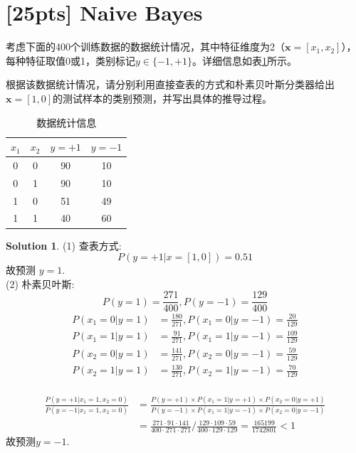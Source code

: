 \documentclass[a4paper,UTF8]{article}
\numberwithin{equation}{section}
\theoremstyle{definition}
\newtheorem*{solution}{Solution}
\begin{document}
\section{[25pts] Naive Bayes}
考虑下面的400个训练数据的数据统计情况，其中特征维度为2（$\mathbf{x}=[x_1,x_2]$），每种特征取值0或1，类别标记$y\in\{-1,+1\}$。详细信息如表\ref{table:training}所示。

根据该数据统计情况，请分别利用直接查表的方式和朴素贝叶斯分类器给出$\mathbf{x}=[1,0]$的测试样本的类别预测，并写出具体的推导过程。
\begin{table}[h]
\centering
\caption{数据统计信息}
\label{table:training}\vspace{2mm}
\begin{tabular}{cc|cc}\hline
$x_1$		&  $x_2$ 	&	$y=+1$	&	$y=-1$ 	\\ \hline
0		&  0 	&	90	&	10 \\
0		&  1 	&	90 	&	10 \\
1		&  0 	&	51 	&	49 \\
1		&  1 	&	40 	&	60 \\\hline
\end{tabular}
\end{table}

\begin{solution}
(1) 查表方式: \\
\begin{equation}
P(y=+1 | x = [1, 0]) = 0.51 
\end{equation}
故预测 $y=1$. \\ 

(2) 朴素贝叶斯: \\
\begin{equation}
P(y = 1) = \frac{271}{400}, P(y=-1) = \frac{129}{400}
\end{equation}
\begin{equation}
\begin{split}
P({x_1=0 |  y=1}) &=  \frac{180}{271}, P({x_1=0| y=-1}) =  \frac{20}{129} \\ 
P({x_1=1| y = 1}) &=  \frac{91}{271}, P({x_1 = 1| y=-1}) =  \frac{109}{129} \\
P({x_2=0| y=1}) &=  \frac{141}{271}, P({x_2=0| y=-1}) =  \frac{59}{129} \\
P({x_2=1| y=1}) &=  \frac{130}{271}, P({x_2=1| y=-1}) =  \frac{70}{129} \\
\end{split}
\end{equation}

\begin{equation}
\begin{split}
\frac{P{(y=+1|x_1=1,x_2=0)}}  { P(y=-1|x_1=1,x_2=0) } &= \frac{ P( y = +1) \times P(x_1 = 1 | y = +1) \times P(x_2 = 0 | y =+ 1) }{   P( y = -1) \times P(x_1 = 1 | y = -1) \times P(x_2 = 0 | y = -1)  }  \\
&= \frac{271\cdot91 \cdot 141}{400\cdot 271 \cdot 271} / \frac{129\cdot 109 \cdot 59}{400\cdot 129 \cdot 129} = \frac{165199}{1742801} < 1
\end{split}
\end{equation}
故预测$y=-1$.
\end{solution}
\end{document}

